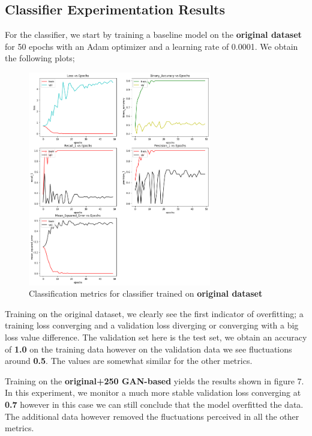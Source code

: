 \documentclass[conference]{IEEEtran}
\begin{document}
\subsection{Classifier Experimentation Results}
For the classifier, we start by training a baseline model on the \textbf{original dataset} for 50 epochs with an Adam optimizer and a learning rate of 0.0001. We obtain the following plots;

\begin{figure}[htbp]
\centerline{\includegraphics[width=80mm]{plot_orig.png}}
\caption{Classification metrics for classifier trained on \textbf{original dataset}}
\label{fig}
\end{figure}

Training on the original dataset, we clearly see the first indicator of overfitting; a training loss converging and a validation loss diverging or converging with a big loss value difference. The validation set here is the test set, we obtain an accuracy of \textbf{1.0} on the training data however on the validation data we see fluctuations around \textbf{0.5}. The values are somewhat similar for the other metrics.

Training on the \textbf{original+250 GAN-based} yields the results shown in figure 7. In this experiment, we monitor a much more stable validation loss converging at \textbf{0.7} however in this case we can still conclude that the model overfitted the data. The additional data however removed the fluctuations perceived in all the other metrics.
\end{document}
